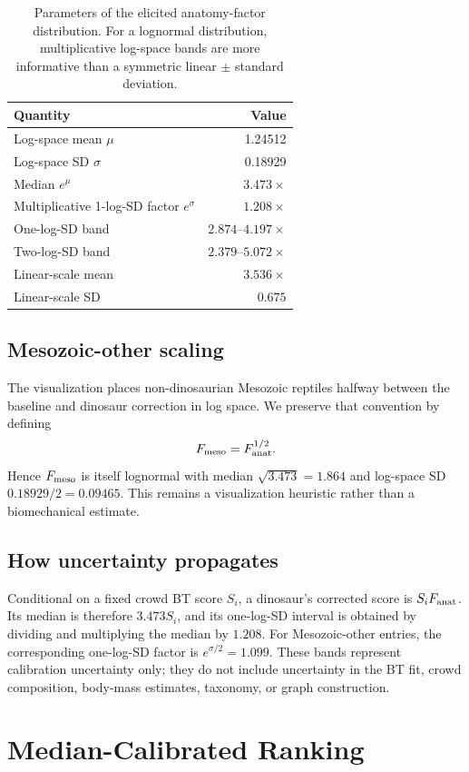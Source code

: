 \documentclass[11pt]{article}
\begin{document}
\begin{table}[H]
\centering
\begin{tabular}{lr}
\toprule
Quantity & Value \\
\midrule
Log-space mean $\mu$ & 1.24512 \\
Log-space SD $\sigma$ & 0.18929 \\
Median $e^\mu$ & $3.473\times$ \\
Multiplicative 1-log-SD factor $e^\sigma$ & $1.208\times$ \\
One-log-SD band & $2.874$--$4.197\times$ \\
Two-log-SD band & $2.379$--$5.072\times$ \\
Linear-scale mean & $3.536\times$ \\
Linear-scale SD & $0.675$ \\
\bottomrule
\end{tabular}
\caption{Parameters of the elicited anatomy-factor distribution. For a lognormal distribution, multiplicative log-space bands are more informative than a symmetric linear $\pm$ standard deviation.}
\label{tab:dist}
\end{table}

\subsection{Mesozoic-other scaling}
The visualization places non-dinosaurian Mesozoic reptiles halfway between the baseline and dinosaur correction in log space. We preserve that convention by defining
\[
F_{\rm meso}=F_{\rm anat}^{1/2}.
\]
Hence $F_{\rm meso}$ is itself lognormal with median $\sqrt{3.473}=1.864$ and log-space SD $0.18929/2=0.09465$. This remains a visualization heuristic rather than a biomechanical estimate.

\subsection{How uncertainty propagates}
Conditional on a fixed crowd BT score $S_i$, a dinosaur's corrected score is $S_iF_{\rm anat}$. Its median is therefore $3.473S_i$, and its one-log-SD interval is obtained by dividing and multiplying the median by $1.208$. For Mesozoic-other entries, the corresponding one-log-SD factor is $e^{\sigma/2}=1.099$. These bands represent calibration uncertainty only; they do not include uncertainty in the BT fit, crowd composition, body-mass estimates, taxonomy, or graph construction.

\section{Median-Calibrated Ranking}
\label{sec:results}
\end{document}
